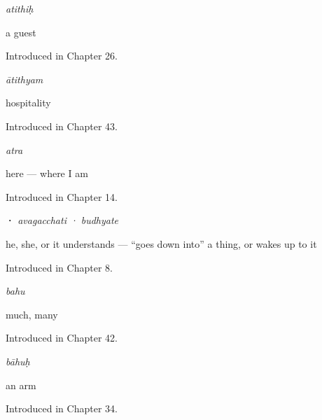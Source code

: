 \noindent\begin{minipage}[t]{\linewidth}
\raggedright
\textbf{}\enspace\emph{atithiḥ}\par
\small a guest\par
\footnotesize Introduced in Chapter 26.
\end{minipage}\par\medskip

\noindent\begin{minipage}[t]{\linewidth}
\raggedright
\textbf{}\enspace\emph{ātithyam}\par
\small hospitality\par
\footnotesize Introduced in Chapter 43.
\end{minipage}\par\medskip

\noindent\begin{minipage}[t]{\linewidth}
\raggedright
\textbf{}\enspace\emph{atra}\par
\small here — where I am\par
\footnotesize Introduced in Chapter 14.
\end{minipage}\par\medskip

\noindent\begin{minipage}[t]{\linewidth}
\raggedright
\textbf{ · }\enspace\emph{avagacchati · budhyate}\par
\small he, she, or it understands — \textquotedblleft{}goes down into\textquotedblright{} a thing, or wakes up to it\par
\footnotesize Introduced in Chapter 8.
\end{minipage}\par\medskip

\noindent\begin{minipage}[t]{\linewidth}
\raggedright
\textbf{}\enspace\emph{bahu}\par
\small much, many\par
\footnotesize Introduced in Chapter 42.
\end{minipage}\par\medskip

\noindent\begin{minipage}[t]{\linewidth}
\raggedright
\textbf{}\enspace\emph{bāhuḥ}\par
\small an arm\par
\footnotesize Introduced in Chapter 34.
\end{minipage}\par\medskip

